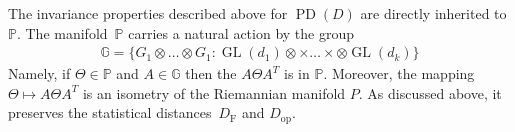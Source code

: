\documentclass[aos]{imsart}
\theoremstyle{definition}
\numberwithin{equation}{section}
\DeclareMathOperator{\GL}{GL}
\DeclareMathOperator{\PD}{PD}
\newcommand{\R}{{\mathbb{R}}}
\renewcommand{\P}{{\mathbb{P}}}
\newcommand{\G}{{\mathbb{G}}}
\newcommand{\ot}{\otimes}
\newcommand{\samp}{x}
\newcommand{\rv}{x}
\newcommand{\DF}{D_{\operatorname{F}}}
\newcommand{\Dop}{D_{\operatorname{op}}}
\newcommand{\CF}[1]{{\color{purple}[CF: #1]}}
\newcommand{\MW}[1]{{\color{red}[MW: #1]}}
\newcommand{\CF}[1]{{}}
\newcommand{\MW}[1]{{}}
\begin{document}
The invariance properties described above for $\PD(D)$ are directly inherited to $\P$.
The manifold~$\P$ carries a natural action by the group
\begin{align*}
  \G =  \{G_1 \ot \dots \ot G_1: \GL(d_1)\ot \times \dots \times \ot \GL(d_k)\}
\end{align*}
Namely, if $\Theta \in \P$ and $A \in \G$ then the $A \Theta A^T$ is in $\P$.
Moreover, the mapping $\Theta \mapsto A\Theta A^T$ is an isometry of the Riemannian manifold $P$.
As discussed above, it preserves the statistical distances~$\DF$ and $\Dop$.


\end{document}
